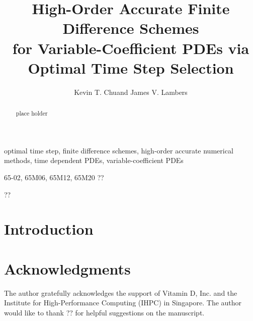 \documentclass[oneeqnum,onefignum,onetabnum,onethmnum]{siamltex}
\title{High-Order Accurate Finite Difference Schemes \\
       for Variable-Coefficient PDEs via Optimal Time Step Selection}
\author{
Kevin T. Chu\footnotemark[2] \footnotemark[3]
and 
James V. Lambers\footnotemark[4]
}
\begin{document}

\maketitle

\renewcommand{\thefootnote}{\fnsymbol{footnote}}

\renewcommand{\thefootnote}{\fnsymbol{footnote}}

\renewcommand{\thefootnote}{\fnsymbol{footnote}}

\renewcommand{\thefootnote}{\arabic{footnote}}


\begin{abstract}
place holder
\end{abstract}


\begin{keywords}
optimal time step, finite difference schemes, high-order accurate numerical 
methods, time dependent PDEs, variable-coefficient PDEs
\end{keywords}

\begin{AMS}
65-02, 65M06, 65M12, 65M20 ??
\end{AMS}

\pagestyle{myheadings}
\thispagestyle{plain}
         {??}


\section*{Introduction}
\cite{zoppou1999, kreiss2002, guidotti2006}

\section*{Acknowledgments}
The author gratefully acknowledges the support of Vitamin D, Inc.
and the Institute for High-Performance Computing (IHPC) in Singapore. 
The author would like to thank ??
for helpful suggestions on the manuscript.  


\end{document}
